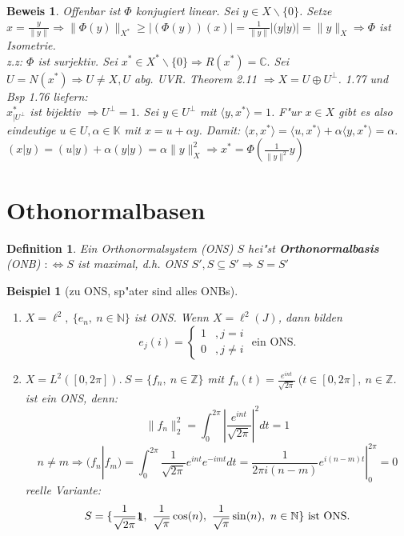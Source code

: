 \documentclass[a4paper,11pt]{book}
\newcommand{\C}{{\mathbb C}}
\newcommand{\N}{{\mathbb N}}
\newcommand{\Z}{{\mathbb Z}}
\newcommand{\K}{{\mathbb K}}
\newcommand{\begriff}[1]{\textbf{#1}} %
\newcommand{\ind}{1\hspace{-0,9ex}\raisebox{-0,2ex}{1}}
\newtheorem{Def}{Definition}[chapter]
\newtheorem*{BspNO}{Beispiel}
\theoremstyle{nonumberplain}
\newtheorem{Bew}{Beweis}
\begin{document}
\begin{Bew}
Offenbar ist $\Phi$ konjugiert linear. Sei $y \in X \backslash \{0\}$. Setze $x = \frac{y}{\|y\|} \Rightarrow \|\Phi(y)\|_{X^{\ast}} \geq | (\Phi(y))(x) | = \frac1{\|y\|} |(y|y)| = \|y\|_X \Rightarrow \Phi$ ist Isometrie.\\
z.z: $\Phi$ ist surjektiv. Sei $x^{\ast} \in X^{\ast} \backslash \{0\} \Rightarrow R(x^{\ast}) = \C.$ Sei $U = N(x^{\ast}) \Rightarrow U \not= X, U$ abg. UVR. Theorem 2.11 $\Rightarrow X = U \oplus U^{\perp}$. 1.77 und Bsp 1.76 liefern:\\
$x^{\ast}_{|U^{\perp}}$ ist bijektiv $\Rightarrow U^{\perp} = 1.$ Sei $y \in U^{\perp}$ mit $\langle y,x^{\ast} \rangle = 1$. F"ur $x \in X$ gibt es also eindeutige $u \in U, \alpha \in \K$ mit $x = u+\alpha y$. Damit: $\langle x,x^{\ast} \rangle = \langle u,x^{\ast} \rangle + \alpha \langle y,x^{\ast} \rangle = \alpha.$\\
$(x|y ) = (u|y) + \alpha (y|y) = \alpha \|y\|_X^2 \Longrightarrow x^{\ast} = \Phi(\frac1{\|y\|^2}y)$
\end{Bew}


\section{Othonormalbasen}

\begin{Def}
Ein Orthonormalsystem (ONS) $S$ hei"st \begriff{Orthonormalbasis} (ONB) $: \Longleftrightarrow S$ ist maximal, d.h. ONS $S', S \subseteq S' \Rightarrow S = S'$
\end{Def}


\begin{BspNO}[zu ONS, sp"ater sind alles ONBs]
\begin{enumerate}
\item[a)] $X = \ell^2,\ \{e_n,\ n \in \N \}$ ist ONS. Wenn $X = \ell^2(J)$, dann bilden
\[
e_j(i) = 
\begin{cases}
1 &, j = i \\
0 &, j \not= i
\end{cases}
\text{ ein ONS.}
\]

\item[b)] $X = L^2([0,2\pi]).\ S = \{ f_n,\ n \in \Z \}$ mit $f_n(t) = \frac{e^{int}}{\sqrt{2\pi}} \ (t \in [0,2\pi], \ n \in \Z$. ist ein ONS, denn:
\[
\|f_n\|_2^2 = \int_0^{2\pi} |\frac{e^{int}}{\sqrt{2\pi}}|^2 dt = 1
\]
\[
n \not= m \Longrightarrow (f_n|f_m) = \int_0^{2\pi} \frac1{\sqrt{2\pi}} e^{int} e^{-imt} dt = \frac1{2\pi i (n-m)} e^{i(n-m)t} |_0^{2\pi} = 0
\]
reelle Variante:
\[
S = \{ \frac1{\sqrt{2 \pi}} \ind,\ \frac1{\sqrt{\pi}} \cos(n),\ \frac1{\sqrt{\pi}} \sin(n),\ n \in \N \} \text{ ist ONS.}
\]
\end{enumerate}
\end{BspNO}
\end{document}
